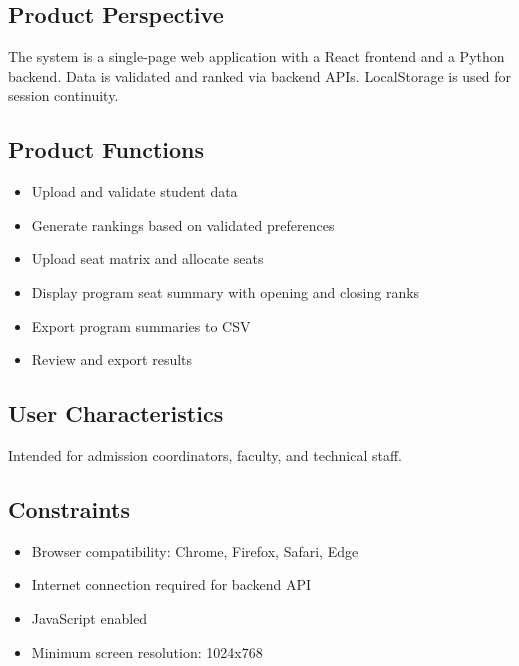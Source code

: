 \documentclass[12pt,a4paper]{article}
\begin{document}
\subsection{Product Perspective}
The system is a single-page web application with a React frontend and a Python backend. Data is validated and ranked via backend APIs. LocalStorage is used for session continuity.

\subsection{Product Functions}
\begin{itemize}
    \item Upload and validate student data
    \item Generate rankings based on validated preferences
    \item Upload seat matrix and allocate seats
    \item Display program seat summary with opening and closing ranks
    \item Export program summaries to CSV
    \item Review and export results
\end{itemize}

\subsection{User Characteristics}
Intended for admission coordinators, faculty, and technical staff.

\subsection{Constraints}
\begin{itemize}
    \item Browser compatibility: Chrome, Firefox, Safari, Edge
    \item Internet connection required for backend API
    \item JavaScript enabled
    \item Minimum screen resolution: 1024x768
\end{itemize}
\end{document}
